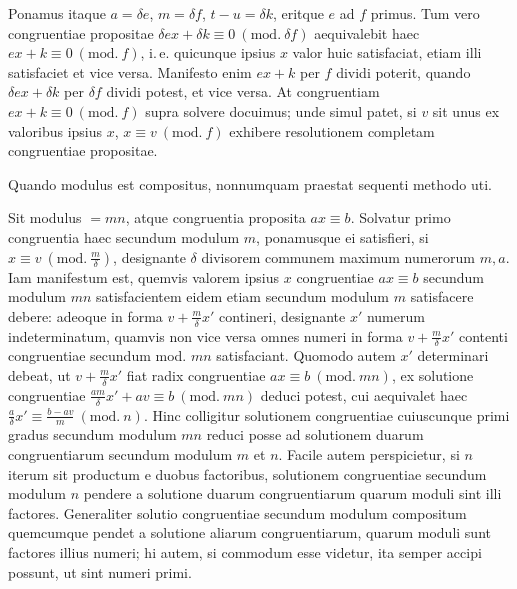 
Ponamus itaque $a = \delta e$, $m = \delta f$, $t - u = \delta k$, eritque $e$ ad $f$
primus. Tum vero congruentiae propositae $\delta e x + \delta k \equiv 0 \ (\mathrm{mod.}\ \delta f)$
aequivalebit haec $ex + k \equiv 0 \ (\mathrm{mod.}\ f)$, i.\,e. quicunque ipsius $x$ valor huic
satisfaciat, etiam illi satisfaciet et vice versa. Manifesto enim $ex+k$ per $f$ dividi
poterit, quando $\delta e x + \delta k$ per $\delta f$ dividi potest, et vice versa. At
congruentiam $ex+k\equiv 0\ (\mathrm{mod.}\ f)$ supra solvere docuimus; unde simul patet, si $v$ sit
unus ex valoribus ipsius $x$, $x \equiv v \ (\mathrm{mod.}\ f)$ exhibere resolutionem completam
congruentiae propositae.


Quando modulus est compositus, nonnumquam praestat sequenti methodo uti.

Sit modulus $=mn$, atque congruentia proposita $ax\equiv b$. Solvatur primo congruentia
haec secundum modulum $m$, ponamusque ei satisfieri, si $x\equiv v \ (\mathrm{mod.}\ \frac{m}{\delta})$,
designante $\delta$ divisorem communem maximum numerorum $m,a$. Iam manifestum est,
quemvis valorem ipsius $x$ congruentiae $ax\equiv b$ secundum modulum $mn$ satisfacientem
eidem etiam secundum modulum $m$ satisfacere debere: adeoque in forma $v+\frac{m}{\delta}x'$
contineri, designante $x'$ numerum indeterminatum, quamvis non vice versa omnes numeri in
forma $v+\frac{m}{\delta}x'$ contenti congruentiae secundum mod. $mn$ satisfaciant. Quomodo
autem $x'$ determinari debeat, ut $v+\frac{m}{\delta}x'$ fiat radix congruentiae
$ax\equiv b \ (\mathrm{mod.}\ mn)$, ex solutione congruentiae $\frac{am}{\delta}x'+av\equiv b\ (\mathrm{mod.}\ mn)$
deduci potest, cui aequivalet haec $\frac{a}{\delta}x'\equiv\frac{b-av}{m}\ (\mathrm{mod.}\ n)$. Hinc
colligitur solutionem congruentiae cuiuscunque primi gradus secundum modulum $mn$ reduci
posse ad solutionem duarum congruentiarum secundum modulum $m$ et $n$. Facile autem
perspicietur, si $n$ iterum sit productum e duobus factoribus, solutionem congruentiae
secundum modulum $n$ pendere a solutione duarum congruentiarum quarum moduli sint illi
factores. Generaliter solutio congruentiae secundum modulum compositum quemcumque pendet
a solutione aliarum congruentiarum, quarum moduli sunt factores illius numeri; hi autem,
si commodum esse videtur, ita semper accipi possunt, ut sint numeri primi.

